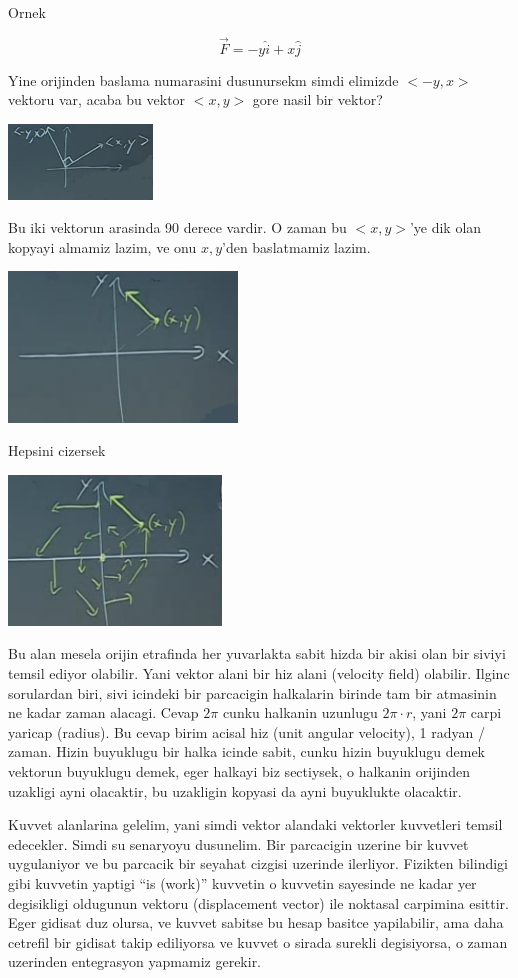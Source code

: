 \documentclass[12pt,fleqn]{article}\usepackage{../common}
\begin{document}
Ornek

\[ \vec{F} = -y\hat{i} + x\hat{j} \]

Yine orijinden baslama numarasini dusunursekm simdi elimizde $<-y,x>$
vektoru var, acaba bu vektor $<x,y>$ gore nasil bir vektor? 

\includegraphics[height=2cm]{19_5.png}

Bu iki vektorun arasinda 90 derece vardir. O zaman bu $<x,y>$'ye dik olan
kopyayi almamiz lazim, ve onu $x,y$'den baslatmamiz lazim. 

\includegraphics[height=4cm]{19_6.png}

Hepsini cizersek

\includegraphics[height=4cm]{19_7.png}

Bu alan mesela orijin etrafinda her yuvarlakta sabit hizda bir akisi olan
bir siviyi temsil ediyor olabilir. Yani vektor alani bir hiz alani
(velocity field) olabilir. Ilginc sorulardan biri, sivi icindeki bir
parcacigin halkalarin birinde tam bir atmasinin ne kadar zaman
alacagi. Cevap $2\pi$ cunku halkanin uzunlugu $2\pi \cdot r$, yani $2\pi$
carpi yaricap (radius). Bu cevap birim acisal hiz (unit angular velocity),
1 radyan / zaman. Hizin buyuklugu bir halka icinde sabit, cunku hizin
buyuklugu demek vektorun buyuklugu demek, eger halkayi biz sectiysek, o
halkanin orijinden uzakligi ayni olacaktir, bu uzakligin kopyasi da ayni
buyuklukte olacaktir. 

Kuvvet alanlarina gelelim, yani simdi vektor alandaki vektorler kuvvetleri
temsil edecekler. Simdi su senaryoyu dusunelim. Bir parcacigin uzerine bir
kuvvet uygulaniyor ve bu parcacik bir seyahat cizgisi uzerinde
ilerliyor. Fizikten bilindigi gibi kuvvetin yaptigi ``is (work)'' kuvvetin
o kuvvetin sayesinde ne kadar yer degisikligi oldugunun vektoru
(displacement vector) ile noktasal carpimina esittir. Eger gidisat duz
olursa, ve kuvvet sabitse bu hesap basitce yapilabilir, ama daha cetrefil
bir gidisat takip ediliyorsa ve kuvvet o sirada surekli degisiyorsa, o
zaman uzerinden entegrasyon yapmamiz gerekir.
\end{document}

